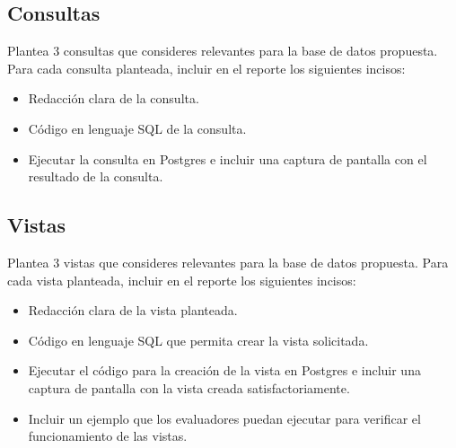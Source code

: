 \subsection{Consultas}

Plantea 3 consultas que consideres relevantes para la base de datos propuesta. Para cada consulta planteada, incluir en el reporte los siguientes incisos:
\begin{itemize}
    \item Redacción clara de la consulta.
    \item Código en lenguaje SQL de la consulta.
    \item Ejecutar la consulta en Postgres e incluir una captura de pantalla con el resultado de la
    consulta.
\end{itemize}

\subsection{Vistas}

Plantea 3 vistas que consideres relevantes para la base de datos propuesta. Para cada vista planteada, incluir en el reporte los siguientes incisos:
\begin{itemize}
    \item Redacción clara de la vista planteada.
    \item Código en lenguaje SQL que permita crear la vista solicitada.
    \item Ejecutar el código para la creación de la vista en Postgres e incluir una captura de pantalla
    con la vista creada satisfactoriamente.
    \item Incluir un ejemplo que los evaluadores puedan ejecutar para verificar el funcionamiento
    de las vistas.
\end{itemize}